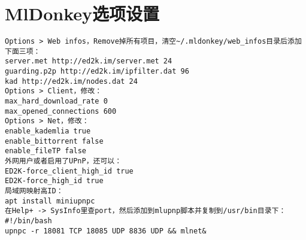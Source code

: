 \documentclass[a4paper,fontset=fandol,zihao=-4,linespread=1.2]{ctexbook}
\begin{document}
\section{MlDonkey选项设置}
\begin{lstlisting}
Options > Web infos，Remove掉所有项目，清空~/.mldonkey/web_infos目录后添加下面三项：
server.met http://ed2k.im/server.met 24
guarding.p2p http://ed2k.im/ipfilter.dat 96
kad http://ed2k.im/nodes.dat 24
Options > Client，修改：
max_hard_download_rate 0
max_opened_connections 600
Options > Net，修改：
enable_kademlia true
enable_bittorrent false
enable_fileTP false
外网用户或者启用了UPnP，还可以：
ED2K-force_client_high_id true
ED2K-force_high_id true
局域网映射高ID：
apt install miniupnpc
在Help+ -> SysInfo里查port，然后添加到mlupnp脚本并复制到/usr/bin目录下：
#!/bin/bash
upnpc -r 18081 TCP 18085 UDP 8836 UDP && mlnet&
\end{lstlisting}
\end{document}
